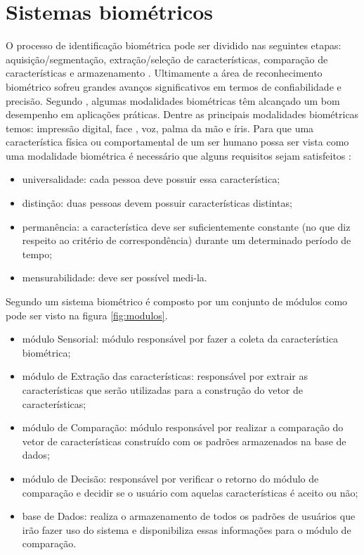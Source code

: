 \section{Sistemas biométricos}
O processo de identificação biométrica pode ser dividido nas seguintes etapas: aquisição/segmentação, extração/seleção de características, comparação de características e armazenamento \cite{sharif2012survey}. Ultimamente a área de reconhecimento biométrico sofreu grandes avanços significativos em termos de confiabilidade e precisão. Segundo , algumas modalidades biométricas têm alcançado um bom desempenho em aplicações práticas. Dentre as principais modalidades biométricas temos: impressão digital, face \cite{sharif2012survey,[20]shermina2012recognition}, voz, palma da mão e íris.
Para que uma característica física ou comportamental de um ser humano possa ser vista como uma modalidade biométrica é necessário que alguns requisitos sejam satisfeitos \cite{jain2004introduction}:

\begin{itemize}
\item universalidade: cada pessoa deve possuir essa característica;
\item distinção: duas pessoas devem possuir características distintas;
\item permanência: a característica deve ser suficientemente constante (no que diz respeito ao critério de correspondência) durante um determinado período de tempo; 
\item mensurabilidade: deve ser possível medi-la. 
\end{itemize}
Segundo  um sistema biométrico é composto por um conjunto de módulos como pode ser visto na figura \ref{fig:modulos}.
\begin{itemize}
\item módulo Sensorial: módulo responsável por fazer a coleta da característica biométrica;
\item módulo de Extração das características: responsável por extrair as características que serão utilizadas para a construção do vetor de características;
\item módulo de Comparação: módulo responsável por realizar a comparação do vetor de características construído com os padrões armazenados na base de dados;
\item módulo de Decisão: responsável por verificar o retorno do módulo de comparação e decidir se o usuário com aquelas características é aceito ou não;
\item base de Dados: realiza o armazenamento de todos os padrões de usuários que irão fazer uso do sistema e disponibiliza essas informações para o módulo de comparação.
\end{itemize}

